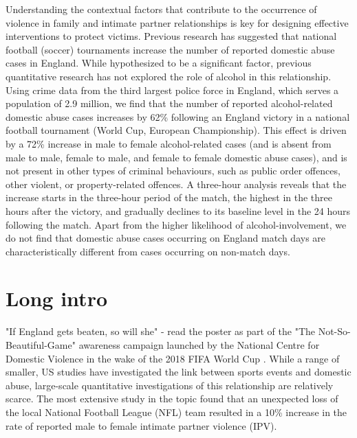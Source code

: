 \documentclass[12pt, letterpaper]{article}
\begin{document}
Understanding the contextual factors that contribute to the occurrence of violence in family and intimate partner relationships is key for designing effective interventions to protect victims. Previous research has suggested that national football (soccer) tournaments increase the number of reported domestic abuse cases in England\autocite{Kirby2014, Brimicombe2012}. While hypothesized to be a significant factor, previous quantitative research has not explored the role of alcohol in this relationship. Using crime data from the third largest police force in England, which serves a population of 2.9 million\autocite{populationfigure}, we find that the number of reported alcohol-related domestic abuse cases increases by 62\% following an England victory in a national football tournament (World Cup, European Championship). This effect is driven by a 72\% increase in male to female alcohol-related cases (and is absent from male to male, female to male, and female to female domestic abuse cases), and is not present in other types of criminal behaviours, such as public order offences, other violent, or property-related offences. A three-hour analysis reveals that the increase starts in the three-hour period of the match, the highest in the three hours after the victory, and gradually declines to its baseline level in the 24 hours following the match. Apart from the higher likelihood of alcohol-involvement, we do not find that domestic abuse cases occurring on England match days are characteristically different from cases occurring on non-match days.


\section{Long intro}

"If England gets beaten, so will she" - read the poster as part of the "The Not-So-Beautiful-Game" awareness campaign launched by the National Centre for Domestic Violence in the wake of the 2018 FIFA World Cup \autocite{NCDV}. While a range of smaller, US studies have investigated the link between sports events and domestic abuse\autocite{Williams2014}, large-scale quantitative investigations of this relationship are relatively scarce. The most extensive study in the topic found that an unexpected loss of the local National Football League (NFL) team resulted in a 10\% increase in the rate of reported male to female intimate partner violence (IPV)\autocite{Card2011}. 
\end{document}
